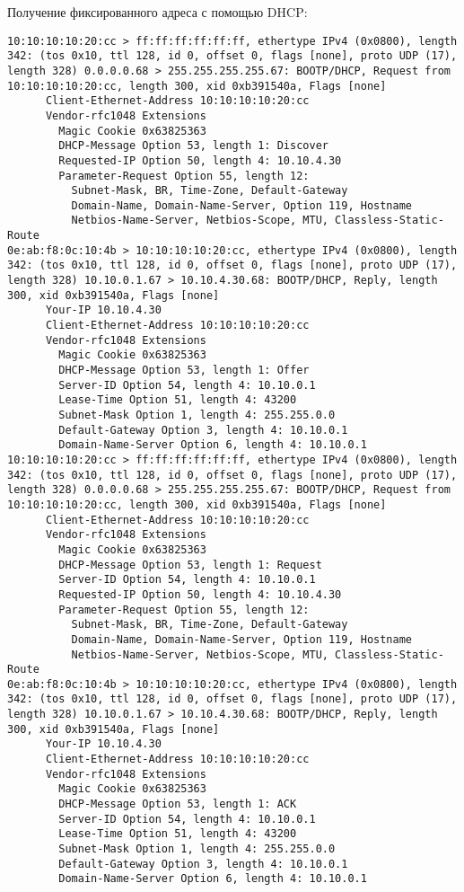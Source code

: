 \documentclass[a4paper,12pt]{article}
\begin{document}
Получение фиксированного адреса с помощью DHCP:
\begin{Verbatim}
10:10:10:10:20:cc > ff:ff:ff:ff:ff:ff, ethertype IPv4 (0x0800), length 342: (tos 0x10, ttl 128, id 0, offset 0, flags [none], proto UDP (17), length 328) 0.0.0.0.68 > 255.255.255.255.67: BOOTP/DHCP, Request from 10:10:10:10:20:cc, length 300, xid 0xb391540a, Flags [none]
	  Client-Ethernet-Address 10:10:10:10:20:cc
	  Vendor-rfc1048 Extensions
	    Magic Cookie 0x63825363
	    DHCP-Message Option 53, length 1: Discover
	    Requested-IP Option 50, length 4: 10.10.4.30
	    Parameter-Request Option 55, length 12: 
	      Subnet-Mask, BR, Time-Zone, Default-Gateway
	      Domain-Name, Domain-Name-Server, Option 119, Hostname
	      Netbios-Name-Server, Netbios-Scope, MTU, Classless-Static-Route
0e:ab:f8:0c:10:4b > 10:10:10:10:20:cc, ethertype IPv4 (0x0800), length 342: (tos 0x10, ttl 128, id 0, offset 0, flags [none], proto UDP (17), length 328) 10.10.0.1.67 > 10.10.4.30.68: BOOTP/DHCP, Reply, length 300, xid 0xb391540a, Flags [none]
	  Your-IP 10.10.4.30
	  Client-Ethernet-Address 10:10:10:10:20:cc
	  Vendor-rfc1048 Extensions
	    Magic Cookie 0x63825363
	    DHCP-Message Option 53, length 1: Offer
	    Server-ID Option 54, length 4: 10.10.0.1
	    Lease-Time Option 51, length 4: 43200
	    Subnet-Mask Option 1, length 4: 255.255.0.0
	    Default-Gateway Option 3, length 4: 10.10.0.1
	    Domain-Name-Server Option 6, length 4: 10.10.0.1
10:10:10:10:20:cc > ff:ff:ff:ff:ff:ff, ethertype IPv4 (0x0800), length 342: (tos 0x10, ttl 128, id 0, offset 0, flags [none], proto UDP (17), length 328) 0.0.0.0.68 > 255.255.255.255.67: BOOTP/DHCP, Request from 10:10:10:10:20:cc, length 300, xid 0xb391540a, Flags [none]
	  Client-Ethernet-Address 10:10:10:10:20:cc
	  Vendor-rfc1048 Extensions
	    Magic Cookie 0x63825363
	    DHCP-Message Option 53, length 1: Request
	    Server-ID Option 54, length 4: 10.10.0.1
	    Requested-IP Option 50, length 4: 10.10.4.30
	    Parameter-Request Option 55, length 12: 
	      Subnet-Mask, BR, Time-Zone, Default-Gateway
	      Domain-Name, Domain-Name-Server, Option 119, Hostname
	      Netbios-Name-Server, Netbios-Scope, MTU, Classless-Static-Route
0e:ab:f8:0c:10:4b > 10:10:10:10:20:cc, ethertype IPv4 (0x0800), length 342: (tos 0x10, ttl 128, id 0, offset 0, flags [none], proto UDP (17), length 328) 10.10.0.1.67 > 10.10.4.30.68: BOOTP/DHCP, Reply, length 300, xid 0xb391540a, Flags [none]
	  Your-IP 10.10.4.30
	  Client-Ethernet-Address 10:10:10:10:20:cc
	  Vendor-rfc1048 Extensions
	    Magic Cookie 0x63825363
	    DHCP-Message Option 53, length 1: ACK
	    Server-ID Option 54, length 4: 10.10.0.1
	    Lease-Time Option 51, length 4: 43200
	    Subnet-Mask Option 1, length 4: 255.255.0.0
	    Default-Gateway Option 3, length 4: 10.10.0.1
	    Domain-Name-Server Option 6, length 4: 10.10.0.1
\end{Verbatim}
\end{document}
